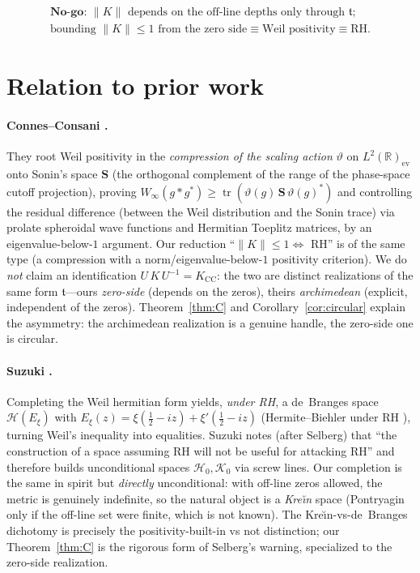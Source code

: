 \documentclass[11pt]{amsart}
\theoremstyle{definition}
\theoremstyle{remark}
\newcommand{\tr}{\operatorname{tr}}
\newcommand{\half}{\tfrac12}
\newcommand{\tform}{\mathfrak t}
\newcommand{\Kop}{K}
\newcommand{\Norm}[1]{\lVert #1 \rVert}
\begin{document}
\[
\boxed{\ \begin{array}{c}
\textbf{No-go: } \Norm{\Kop}\text{ depends on the off-line depths only through }\tform;\\[2pt]
\text{bounding }\Norm{\Kop}\le1\text{ from the zero side}\equiv\text{Weil positivity}\equiv\text{RH.}
\end{array}\ }
\]

\section{Relation to prior work}\label{sec:prior}

\paragraph{Connes--Consani \cite{ConnesConsani}.} They root Weil positivity in the
\emph{compression of the scaling action} $\vartheta$ on $L^{2}(\mathbb R)_{\mathrm{ev}}$
onto Sonin's space $\mathbf S$ (the orthogonal complement of the range of the phase-space
cutoff projection), proving $W_\infty(g*g^{*})\ge\tr(\vartheta(g)\,\mathbf S\,\vartheta(g)^{*})$
and controlling the residual difference (between the Weil distribution and the Sonin
trace) via prolate spheroidal wave functions and Hermitian Toeplitz matrices, by an
eigenvalue-below-$1$ argument. Our reduction ``$\Norm{\Kop}\le1\iff$ RH'' is of the same
type (a compression with a norm/eigenvalue-below-$1$ positivity criterion). We do
\emph{not} claim an identification $U\,\Kop\,U^{-1}=K_{\mathrm{CC}}$: the two are distinct
realizations of the same form $\tform$---ours \emph{zero-side} (depends on the zeros),
theirs \emph{archimedean} (explicit, independent of the zeros). Theorem~\ref{thm:C} and
Corollary~\ref{cor:circular} explain the asymmetry: the archimedean realization is a
genuine handle, the zero-side one is circular.

\paragraph{Suzuki \cite{Suzuki}.} Completing the Weil hermitian form yields, \emph{under
RH}, a de~Branges space $\mathcal H(E_\xi)$ with $E_\xi(z)=\xi(\half-iz)+\xi'(\half-iz)$
(Hermite--Biehler under RH \cite{Lagarias}), turning Weil's inequality into equalities.
Suzuki notes (after Selberg) that ``the construction of a space assuming RH will not be
useful for attacking RH'' and therefore builds unconditional spaces $\mathcal H_0,
\mathcal K_0$ via screw lines. Our completion is the same in spirit but \emph{directly}
unconditional: with off-line zeros allowed, the metric is genuinely indefinite, so the
natural object is a \emph{Kre\u{\i}n} space (Pontryagin only if the off-line set were
finite, which is not known). The Kre\u{\i}n-vs-de~Branges dichotomy is precisely the
positivity-built-in vs not distinction; our Theorem~\ref{thm:C} is the rigorous form of
Selberg's warning, specialized to the zero-side realization.
\end{document}
